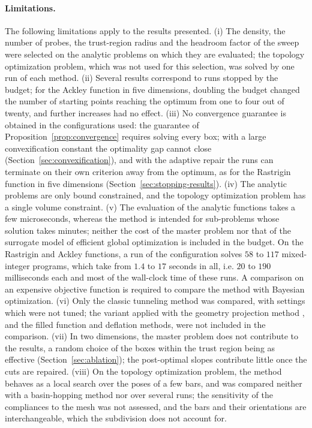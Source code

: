 \documentclass[pdflatex,sn-basic]{sn-jnl}
\begin{document}
\paragraph{Limitations.} The following limitations apply to the results
presented.
(i) The density, the number of probes, the trust-region radius and the headroom
factor of the sweep were selected on the analytic problems on which they are
evaluated; the topology optimization problem, which was not used for this
selection, was solved by one run of each method.
(ii) Several results correspond to runs stopped by the budget; for the Ackley
function in five dimensions, doubling the budget changed the number of starting
points reaching the optimum from one to four out of twenty, and further increases
had no effect.
(iii) No convergence guarantee is obtained in the configurations used: the
guarantee of Proposition~\ref{prop:convergence} requires solving every box;
with a large convexification constant the optimality gap cannot close
(Section~\ref{sec:convexification}),
and with the adaptive repair the runs can terminate on their own criterion away
from the optimum, as for the Rastrigin function in five dimensions
(Section~\ref{sec:stopping-results}).
(iv) The analytic problems are only bound constrained, and the topology
optimization problem has a single volume constraint.
(v) The evaluation of the analytic functions takes a few microseconds, whereas
the method is intended for sub-problems whose solution takes minutes; neither
the cost of the master problem nor that of the surrogate model of efficient
global optimization is included in the budget. On the Rastrigin and Ackley
functions, a run of the configuration solves $58$ to $117$ mixed-integer
programs, which take from $1.4$ to $17$ seconds in all, i.e. $20$ to
$190$ milliseconds each and most of the wall-clock time of these runs. A comparison on an expensive
objective function is required to compare the method with Bayesian optimization.
(vi) Only the classic tunneling method was compared, with settings which were
not tuned; the variant applied with the geometry projection method
\citep{zhang2018tunneling}, and the filled function and deflation methods, were
not included in the comparison.
(vii) In two dimensions, the master problem does not contribute to the results,
a random choice of the boxes within the trust region being as effective
(Section~\ref{sec:ablation}); the post-optimal slopes contribute little once
the cuts are repaired.
(viii) On the topology optimization problem, the method behaves as a local
search over the poses of a few bars, and was compared neither with a
basin-hopping method nor over several runs; the sensitivity of the compliances
to the mesh was not assessed, and the bars and their orientations are
interchangeable, which the subdivision does not account for.
\end{document}
